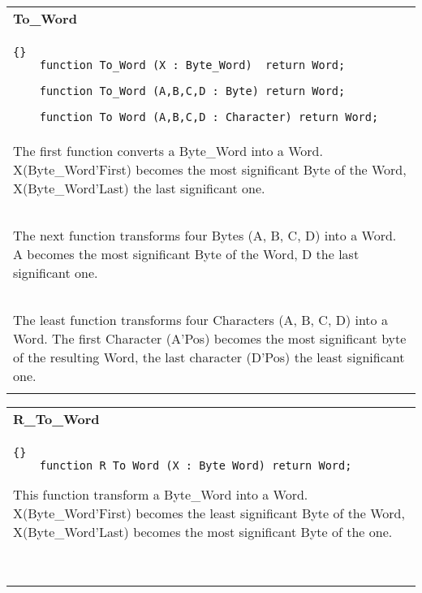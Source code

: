 
\begin{tabular}{p{\textwidth}}
  \textbf{To\_Word}\ \\
  \begin{lstlisting}{}
    function To_Word (X : Byte_Word)  return Word;

    function To_Word (A,B,C,D : Byte) return Word;

    function To_Word (A,B,C,D : Character) return Word;  
\end{lstlisting}\\ 
  The first function converts a  Byte\_Word into a Word.
  X(Byte\_Word'First) becomes the most significant Byte of the Word,
  X(Byte\_Word'Last) the last significant one.\\ \ \\
  The next function  transforms four Bytes (A, B, C, D) into a Word.
  A becomes the most significant Byte of the Word, D the last significant one.
  \\ \ \\
  The least function transforms four Characters (A, B, C, D) into a Word.
  The first Character (A'Pos) becomes the most significant byte of the
  resulting Word, the last character (D'Pos) the least significant one.\ \ \\
  \hline\\
\end{tabular}


\begin{tabular}{p{\textwidth}}   
  \textbf{R\_To\_Word}\ \\
  \begin{lstlisting}{}
    function R_To_Word (X : Byte_Word) return Word;   
  \end{lstlisting}
  This function transform a Byte\_Word into a Word.
  X(Byte\_Word'First) becomes the least significant Byte of the Word,
  X(Byte\_Word'Last) becomes the most significant Byte of the one.\\ \ \\
  \hline\\
\end{tabular}



